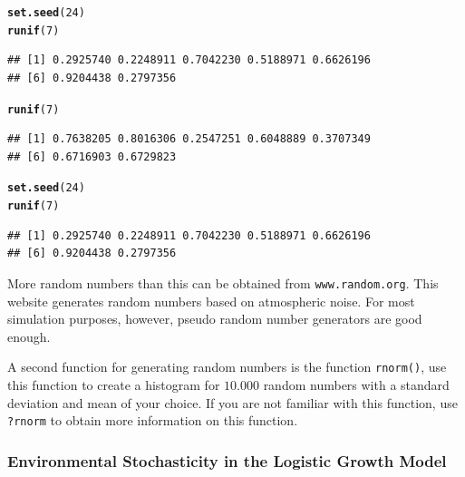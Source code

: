 \documentclass{article}\usepackage[]{graphicx}\usepackage[]{color}
\makeatletter
\newcommand{\hlnum}[1]{\textcolor[rgb]{0.686,0.059,0.569}{#1}}%
\newcommand{\hlstd}[1]{\textcolor[rgb]{0.345,0.345,0.345}{#1}}%
\newcommand{\hlkwd}[1]{\textcolor[rgb]{0.737,0.353,0.396}{\textbf{#1}}}%
\newenvironment{kframe}{%
 \def\at@end@of@kframe{}%
 \ifinner\ifhmode%
  \def\at@end@of@kframe{\end{minipage}}%
  \begin{minipage}{\columnwidth}%
 \fi\fi%
 \def\FrameCommand##1{\hskip\@totalleftmargin \hskip-\fboxsep
 \colorbox{shadecolor}{##1}\hskip-\fboxsep
     \hskip-\linewidth \hskip-\@totalleftmargin \hskip\columnwidth}%
 \MakeFramed {\advance\hsize-\width
   \@totalleftmargin\z@ \linewidth\hsize
   \@setminipage}}%
 {\par\unskip\endMakeFramed%
 \at@end@of@kframe}
\newenvironment{knitrout}{}{} %
\makeatother
\begin{document}
\begin{knitrout}
\color{fgcolor}\begin{kframe}
\begin{alltt}
\hlkwd{set.seed}\hlstd{(}\hlnum{24}\hlstd{)}
\hlkwd{runif}\hlstd{(}\hlnum{7}\hlstd{)}
\end{alltt}
\begin{verbatim}
## [1] 0.2925740 0.2248911 0.7042230 0.5188971 0.6626196
## [6] 0.9204438 0.2797356
\end{verbatim}
\begin{alltt}
\hlkwd{runif}\hlstd{(}\hlnum{7}\hlstd{)}
\end{alltt}
\begin{verbatim}
## [1] 0.7638205 0.8016306 0.2547251 0.6048889 0.3707349
## [6] 0.6716903 0.6729823
\end{verbatim}
\begin{alltt}
\hlkwd{set.seed}\hlstd{(}\hlnum{24}\hlstd{)}
\hlkwd{runif}\hlstd{(}\hlnum{7}\hlstd{)}
\end{alltt}
\begin{verbatim}
## [1] 0.2925740 0.2248911 0.7042230 0.5188971 0.6626196
## [6] 0.9204438 0.2797356
\end{verbatim}
\end{kframe}
\end{knitrout}
More random numbers than this can be obtained from \texttt{www.random.org}. This website generates random numbers based on atmospheric noise. For most simulation purposes, however, pseudo random number generators are good enough.

A second function for generating random numbers is the function \texttt{rnorm()}, use this function to create a histogram for $10.000$ random numbers with a standard deviation and mean of your choice. If you are not familiar with this function, use \texttt{?rnorm} to obtain more information on this function.

\subsubsection{Environmental Stochasticity in the Logistic Growth Model}
\end{document}
